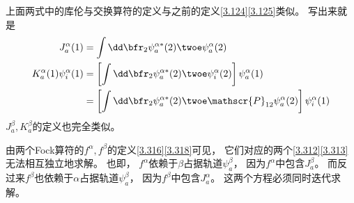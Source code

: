 上面两式中的库伦与交换算符的定义与之前的定义\autoref{3.124}\autoref{3.125}类似。
写出来就是
\begin{align}
	J_a^\alpha(1) & = \int \dd\bfr_2 \psi_a^{\alpha*}(2) \twoe \psi_a^\alpha(2) \label{3.319}\\
	K_a^\alpha(1)\psi_i^\alpha(1) 
	    &= \left[ \int \dd\bfr_2 \psi_a^{\alpha*}(2) \twoe \psi_i^\alpha(2)\right] \psi_a^\alpha(1) \notag\\
	    &= \left[ \int \dd\bfr_2 \psi_a^{\alpha*}(2) \twoe \mathscr{P}_{12}\psi_a^\alpha(2)\right] \psi_i^\alpha(1) \label{3.320}
\end{align}
$J_a^\beta,K_a^\beta$的定义也完全类似。

由两个Fock算符的$f^\alpha,f^\beta$的定义\autoref{3.316}\autoref{3.318}可见，
它们对应的两个\autoref{3.312}\autoref{3.313}无法相互独立地求解。
也即，
$f^\alpha$依赖于$\beta$占据轨道$\psi_a^\beta$，
因为$f^\alpha$中包含$J_a^\beta$。
而反过来$f^\beta$也依赖于$\alpha$占据轨道$\psi_a^\beta$，
因为$f^\beta$中包含$J_a^\alpha$。
这两个方程必须同时迭代求解。


